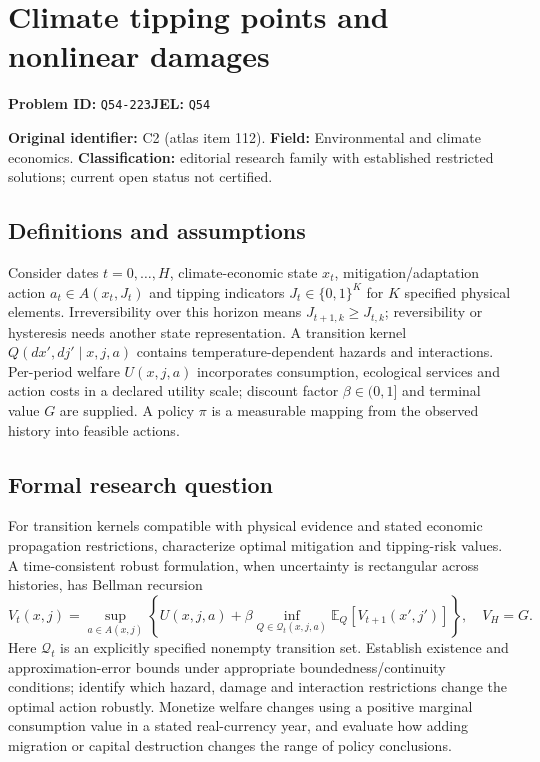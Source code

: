 \documentclass[11pt,a4paper]{article}
\begin{document}
\section*{Climate tipping points and nonlinear damages}
\textbf{Problem ID:} \texttt{Q54-223}\quad \textbf{JEL:} \texttt{Q54}\par
\label{problem:OP-0112}
\label{atlas:prob:C2}

\noindent\textbf{Original identifier:} C2 (atlas item 112). \textbf{Field:} Environmental and climate economics. \textbf{Classification:} editorial research family with established restricted solutions; current open status not certified.

\subsection*{Definitions and assumptions}

Consider dates $t=0,\ldots,H$, climate-economic state $x_t$, mitigation/adaptation action $a_t\in A(x_t,J_t)$ and tipping indicators $J_t\in\{0,1\}^K$ for $K$ specified physical elements. Irreversibility over this horizon means $J_{t+1,k}\ge J_{t,k}$; reversibility or hysteresis needs another state representation. A transition kernel $Q(dx',dj'\mid x,j,a)$ contains temperature-dependent hazards and interactions. Per-period welfare $U(x,j,a)$ incorporates consumption, ecological services and action costs in a declared utility scale; discount factor $\beta\in(0,1]$ and terminal value $G$ are supplied. A policy $\pi$ is a measurable mapping from the observed history into feasible actions.

\subsection*{Formal research question}

For transition kernels compatible with physical evidence and stated economic propagation restrictions, characterize optimal mitigation and tipping-risk values. A time-consistent robust formulation, when uncertainty is rectangular across histories, has Bellman recursion
\[
V_t(x,j)=\sup_{a\in A(x,j)}
\left\{U(x,j,a)+\beta\inf_{Q\in\mathcal Q_t(x,j,a)}
\mathbb E_Q[V_{t+1}(x',j')]\right\},\quad V_H=G.
\]
Here $\mathcal Q_t$ is an explicitly specified nonempty transition set. Establish existence and approximation-error bounds under appropriate boundedness/continuity conditions; identify which hazard, damage and interaction restrictions change the optimal action robustly. Monetize welfare changes using a positive marginal consumption value in a stated real-currency year, and evaluate how adding migration or capital destruction changes the range of policy conclusions.
\end{document}
